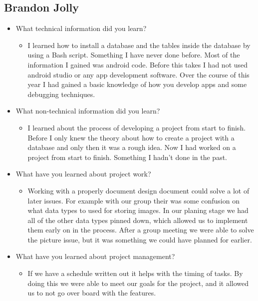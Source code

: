\documentclass[onecolumn, draftclsnofoot,10pt, compsoc]{IEEEtran}
\begin{document}
 \subsection{Brandon Jolly}
 \begin{itemize}
     \item What technical information did you learn?
     \begin{itemize}
         \item I learned how to install a database and the tables inside the database by using a Bash script. Something I have never done before. Most of the information I gained was android code. Before this takes I had not used android studio or any app development software. Over the course of this year I had gained a basic knowledge of how you develop apps and some debugging techniques.
     \end{itemize}
     \item What non-technical information did you learn?
     \begin{itemize}
         \item I learned about the process of developing a project from start to finish. Before I only knew the theory about how to create a project with a database and only then it was a rough idea. Now I had worked on a project from start to finish. Something I hadn't done in the past. 
     \end{itemize}
     \item What have you learned about project work?
     \begin{itemize}
         \item Working with a properly document design document could solve a lot of later issues. For example with our group their was some confusion on what data types to used for storing images. In our planing stage we had all of the other data types pinned down, which allowed us to implement them early on in the process. After a group meeting we were able to solve the picture issue, but it was something we could have planned for earlier.
     \end{itemize}
     \item What have you learned about project management?
     \begin{itemize}
         \item If we have a schedule written out it helps with the timing of tasks. By doing this we were able to meet our goals for the project, and it allowed us to not go over board with the features.
     \end{itemize}

\end{itemize}
\end{document}
